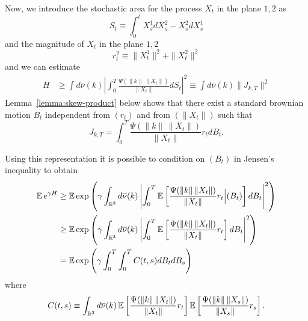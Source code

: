 Now, we introduce the stochastic area for the process $X_t$ in the plane
$1,2$ as
$$
S_t \equiv \int_0^t X_s^1 dX_s^2 - X_s^2 dX_s^1
$$
and the magnitude of $X_t$ in the plane $1,2$
$$
r^2_t \equiv \|X_t^1\|^2 + \|X_t^2\|^2
$$
and we can estimate
\begin{equation*}
\begin{split}
H & \ge 
\int d\overline{\nu}(k)
\left|\int_{0}^{T} \frac{\Psi(\|k\|\,\|X_t\|)}{\|X_t\|}  
   dS_t
\right|^2 
\equiv
\int d\overline{\nu}(k)
\|J_{k,T}\|^2
\end{split}
\end{equation*}
Lemma~\ref{lemma:skew-product} below shows that there exist a standard
brownian motion $B_t$ independent from $(r_t)$ and from $(\|X_t\|)$  such that 
\begin{equation}
J_{k,T} = \int_0^T  \frac{\Psi(\|k\|\,\|X_t\|)}{\|X_t\|} r_t dB_t.
\label{eq:representation}
\end{equation}

Using this representation it is possible to  condition on $(B_t)$ in Jensen's
inequality to obtain
\begin{equation*}
\begin{split}
\operatorname{{\mathbb E}} e^{\gamma H} & \ge  
\operatorname{{\mathbb E}} \exp \left( \gamma \int_{\mathbb{R}^3} d\overline{\nu}(k)  
\left| 
\int_0^T  \operatorname{{\mathbb E}} \left[ \frac{\Psi(\|k\|\,\|X_t\|)}{\|X_t\|} r_t  \Big | (B_t)
\right]  dB_t
\right|^2  \right) \\
 & \ge  
\operatorname{{\mathbb E}} \exp \left( \gamma \int_{\mathbb{R}^3} d\overline{\nu}(k)
\left| 
\int_0^T  \operatorname{{\mathbb E}} \left[  \frac{\Psi(\|k\|\,\|X_t\|)}{\|X_t\|} r_t  
\right]  dB_t
\right|^2  \right) \\
&  =   
\operatorname{{\mathbb E}} \exp \left( \gamma  
\int_0^T  \int_0^T  C(t,s) dB_t dB_s 
\right) \\
\end{split}
\end{equation*}
where
$$
C(t,s) \equiv   \int_{\mathbb{R}^3} d\overline{\nu}(k) 
\operatorname{{\mathbb E}} \left[  \frac{\Psi(\|k\|\,\|X_t\|)}{\|X_t\|} r_t
\right]
\operatorname{{\mathbb E}} \left[  \frac{\Psi(\|k\|\,\|X_s\|)}{\|X_s\|} r_s \right].
$$

